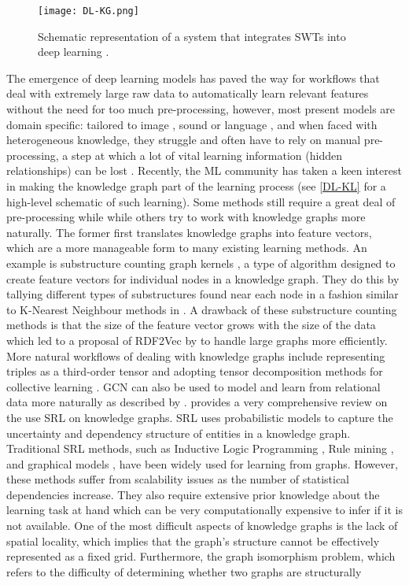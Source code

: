 \begin{figure}[t]
	\centering
	\texttt{[image: DL-KG.png]}
	\caption{Schematic representation of a system that integrates \acp{SWT} into deep learning \citep{Futia2020OnResearch}.} 
	\label{DL-KL}
\end{figure}

The emergence of deep learning models has paved the way for workflows that deal with extremely large raw data to automatically learn relevant features without the need for too much pre-processing, however, most present models are domain specific: tailored to image \citep{Cun1990, Krizhevsky, Le2013, Lowe1999}, sound or language \citep{Graves2013, Nguyen2015}, and when faced with heterogeneous knowledge, they struggle and often have to rely on manual pre-processing, a step at which a lot of vital learning information (hidden relationships) can be lost \citep{Wilcke2017}. Recently, the \ac{ML} community has taken a keen interest in making the knowledge graph part of the learning process (see \autoref{DL-KL} for a high-level schematic of such learning). Some methods still require a great deal of pre-processing while while others try to work with knowledge graphs more naturally. The former first translates knowledge graphs into feature vectors, which are a more manageable form to many existing learning methods. An example is substructure counting graph kernels \citep{Losch2012}, a type of algorithm designed to create feature vectors for individual nodes in a knowledge graph. They do this by tallying different types of substructures found near each node in a fashion similar to K-Nearest Neighbour methods in \cite{Cunningham2007}. A drawback of these substructure counting methods is that the size of the feature vector grows with the size of the data which led to a proposal of RDF2Vec by \cite{Ristoski2016} to handle large graphs more efficiently. More natural workflows of dealing with knowledge graphs include representing triples as a third-order tensor and adopting tensor decomposition methods for collective learning \citep{Kolda2009TensorApplications, Nickel2013TensorLearning}. \ac{GCN} \citep{Kipf2016} can also be used to model and learn from relational data more naturally as described by \cite{Schlichtkrull2017}. \cite{Nickel2016} provides a very comprehensive review on the use \ac{SRL} on knowledge graphs. \ac{SRL} uses probabilistic models to capture the uncertainty and dependency structure of entities in a knowledge graph. Traditional \ac{SRL} methods, such as Inductive Logic Programming \citep{Muggleton1994InductiveMethods}, Rule mining \citep{Volker2011StatisticalInduction}, and graphical models \cite{Wainwright2008GraphicalInference}, have been widely used for learning from graphs. However, these methods suffer from scalability issues as the number of statistical dependencies increase. They also require extensive prior knowledge about the learning task at hand which can be very computationally expensive to infer if it is not available. One of the most difficult aspects of knowledge graphs is the lack of spatial locality, which implies that the graph's structure cannot be effectively represented as a fixed grid. Furthermore, the graph isomorphism problem, which refers to the difficulty of determining whether two graphs are structurally 